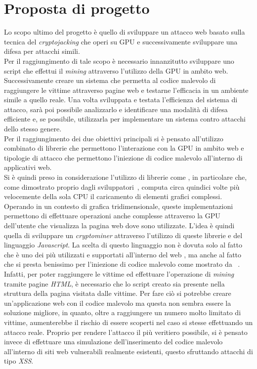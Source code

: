 \documentclass[
11pt, %
oneside, %
italian, %
onehalfspacing,%
headsepline, %
]{MastersDoctoralThesis} %
\newcommand\citen[1]{\citeauthor{#1} \citep{#1}}
\begin{document}
{\chapter{Proposta di progetto}}
Lo scopo ultimo del progetto è quello di sviluppare un attacco web basato sulla tecnica del \emph{cryptojacking} che operi su GPU e successivamente sviluppare una difesa per attacchi simili.\\
Per il raggiungimento di tale scopo è necessario innanzitutto sviluppare uno script che effettui il \emph{mining} attraverso l'utilizzo della GPU in ambito web. Successivamente creare un sistema che permetta al codice malevolo di raggiungere le vittime attraverso pagine web e testarne l'efficacia in un ambiente simile a quello reale. Una volta sviluppata e testata l'efficienza del sistema di attacco, sarà poi possibile analizzarlo e identificare una modalità di difesa efficiente e, se possibile, utilizzarla per implementare un sistema contro attacchi dello stesso genere.\\
Per il raggiungimento dei due obiettivi principali si è pensato all'utilizzo combinato di librerie che permettono l'interazione con la GPU in ambito web e  tipologie di attacco che permettono l'iniezione di codice malevolo all'interno di applicativi web.\\
Si è quindi preso in considerazione l'utilizzo di librerie come , in particolare  che, come dimostrato proprio dagli sviluppatori~\citep{banchmarkGPU.js}, computa circa quindici volte più velocemente della sola CPU il caricamento di elementi grafici complessi. Operando in un contesto di grafica tridimensionale, queste implementazioni permettono di effettuare operazioni anche complesse attraverso la GPU dell'utente che visualizza la pagina web dove sono utilizzate. L'idea è quindi quella di sviluppare un \emph{cryptominer} attraverso l'utilizzo di queste librerie e del linguaggio \emph{Javascript}. La scelta di questo linguaggio non è dovuta solo al fatto che è uno dei più utilizzati e supportati all'interno del web \citep{w3techsJavascriptPopularity}, ma anche al fatto che si presta benissimo per l'iniezione di codice malevolo come mostrato da~\citen{owaspxss}.\\
Infatti, per poter raggiungere le vittime ed effettuare l'operazione di \emph{mining} tramite pagine \emph{HTML}, è necessario che lo script creato sia presente nella struttura della pagina visitata dalle vittime. Per fare ciò si potrebbe creare un'applicazione web con il codice malevolo ma questa non sembra essere la soluzione migliore, in quanto, oltre a raggiungere un numero molto limitato di vittime, aumenterebbe il rischio di essere scoperti nel caso si stesse effettuando un attacco reale. Proprio per rendere l'attacco il più veritiero possibile, si è pensato invece di effettuare una simulazione dell'inserimento del codice malevolo all'interno di siti web vulnerabili realmente esistenti, questo sfruttando attacchi di tipo \emph{XSS}.\\
\end{document}
